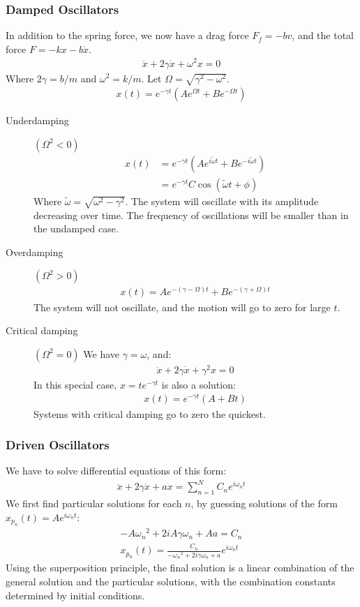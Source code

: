 \documentclass[11pt, letterpaper]{article}
\begin{document}
\begin{multicols*}{3}
\subsubsection{Damped Oscillators}
In addition to the spring force, we now have a drag force $F_f=-bv$, and the
total force $F=-kx-b\dot{x}$.
\begin{align*}
  \ddot{x} + 2\gamma\dot{x}+\omega^2x=0
\end{align*}
Where $2\gamma=b/m$ and $\omega^2=k/m$. Let $\Omega = \sqrt{\gamma^2-\omega^2}$.
\begin{align*}
  x(t)=e^{-\gamma t}(Ae^{\Omega t}+Be^{-\Omega t})
\end{align*}
\begin{description}
\item [Underdamping] $(\Omega^2<0)$
  \begin{align*}
    x(t)&=e^{-\gamma t}(Ae^{i\tilde{\omega}t}+Be^{-i\tilde{\omega}t})\\
    &=e^{-\gamma t}C\cos(\tilde{\omega}t + \phi)
  \end{align*}
  Where $\tilde{\omega}=\sqrt{\omega^2-\gamma^2}$. The system will oscillate
  with its amplitude decreasing over time. The frequency of oscillations will be
  smaller than in the undamped case.
\item[Overdamping] $(\Omega^2>0)$
  \begin{align*}
    x(t)=Ae^{-(\gamma-\Omega)t}+Be^{-(\gamma+\Omega)t}
  \end{align*}
  The system will not oscillate, and the motion will go to zero for large $t$.
\item[Critical damping] $(\Omega^2=0)$
  We have $\gamma=\omega$, and:
  \begin{align*}
    \ddot{x}+2\gamma\dot{x}+\gamma^2x=0
  \end{align*}
  In this special case, $x=te^{-\gamma t}$ is also a solution:
  \begin{align*}
    x(t)=e^{-\gamma t}(A+Bt)
  \end{align*}
  Systems with critical damping go to zero the quickest.
\end{description}
\subsubsection{Driven Oscillators}
We have to solve differential equations of this form:
\begin{align*}
  \ddot{x}+2\gamma\dot{x}+ax=\sum_{n=1}^{N}{C_ne^{i\omega_nt}}
\end{align*}
We first find particular solutions for each $n$, by guessing solutions of the
form $x_{p_n}(t)=Ae^{i\omega_nt}$:
\begin{align*}
  -A{\omega_n}^2+2iA\gamma\omega_n+Aa=C_n \\
  x_{p_n}(t)=\frac{C_n}{-{\omega_n}^2+2i\gamma\omega_n+a}e^{i\omega_nt}
\end{align*}
Using the superposition principle, the final solution is a linear combination of
the general solution and the particular solutions, with the combination
constants determined by initial conditions.

\end{multicols*}
\end{document}
